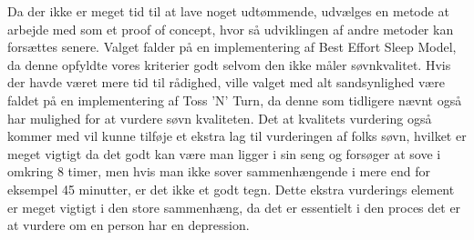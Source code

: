 Da der ikke er meget tid til at lave noget udtømmende, udvælges en metode at arbejde med som et proof of concept, hvor så udviklingen af andre metoder kan forsættes senere.
Valget falder på en implementering af Best Effort Sleep Model, da denne opfyldte vores kriterier godt selvom den ikke måler søvnkvalitet.
Hvis der havde været mere tid til rådighed, ville valget med alt sandsynlighed være faldet på en implementering af Toss 'N' Turn, da denne som tidligere nævnt også har mulighed for at vurdere søvn kvaliteten.
Det at kvalitets vurdering også kommer med vil kunne tilføje et ekstra lag til vurderingen af folks søvn, hvilket er meget vigtigt da det godt kan være man ligger i sin seng og forsøger at sove i omkring 8 timer, men hvis man ikke sover sammenhængende i mere end for eksempel 45 minutter, er det ikke et godt tegn.
Dette ekstra vurderings element er meget vigtigt i den store sammenhæng, da det er essentielt i den proces det er at vurdere om en person har en depression. 
